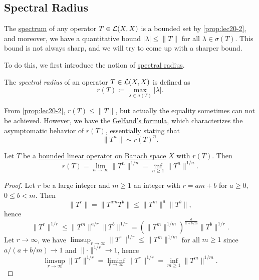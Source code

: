 \subsection{Spectral Radius}
The \hyperref[def:spectrum-point]{spectrum} of any operator \(T\in \mathcal{\MakeUppercase{l}} (X, X)\) is a bounded set by \autoref{prop:lec20-2}, and moreover, we have a quantitative bound \(\vert \lambda  \vert \leq \lVert T \rVert  \) for all \(\lambda \in \sigma (T)\). This bound is not always sharp, and we will try to come up with a sharper bound.

To do this, we first introduce the notion of \hyperref[def:spectral-radius]{spectral radius}.

\begin{definition}\label{def:spectral-radius}
	The \emph{spectral radius} of an operator \(T\in \mathcal{\MakeUppercase{l}} (X, X)\) is defined as
	\[
		r(T) \coloneqq \max _{\lambda\in \sigma (T) }\vert \lambda \vert .
	\]
\end{definition}

From \autoref{prop:lec20-2}, \(r(T) \leq \lVert T \rVert \), but actually the equality sometimes can not be achieved. However, we have the \hyperref[thm:Gelfand-formula]{Gelfand's formula}, which characterizes the asymptomatic behavior of \(r(T)\), essentially stating that
\[
	\lVert T^n \rVert \sim r(T)^n.
\]

\begin{theorem}\label{thm:Gelfand-formula}
	Let \(T\) be a \hyperref[def:bounded-linear-op]{bounded linear operator} on \hyperref[def:Banach-space]{Banach space} \(X\) with \(r(T)\). Then
	\[
		r(T) = \lim_{n \to \infty} \lVert T^n \rVert ^{1 / n} = \inf _{n\geq 1}\lVert T^n \rVert ^{1 / n}.
	\]
\end{theorem}
\begin{proof}\let\qed\relax
	Let \(r\) be a large integer and \(m\geq 1\) an integer with \(r = am+b\) for \(a \geq 0\), \(0 \leq b < m\). Then
	\[
		\lVert T^r \rVert
		= \lVert T^{am} T^b\rVert
		\leq \lVert T^m \rVert ^a \lVert T^b \rVert,
	\]
	hence
	\[
		\lVert T^r \rVert ^{1 / r}
		\leq \lVert T^m \rVert ^{a / r} \lVert T^b \rVert ^{1 / r}
		= \left( \lVert T^m \rVert ^{1 / m} \right) ^{\frac{a}{a+ b / m}} \lVert T^b \rVert ^{1 / r}.
	\]
	Let \(r \to \infty \), we have \(\limsup_{r \to \infty} \lVert T^r \rVert ^{1 / r} \leq \lVert T^m \rVert ^{1 / m}\) for all \(m \geq 1\) since \(a / (a + b / m) \to 1\) and \(\lVert \cdot \rVert ^{1 / r} \to 1\), hence
	\[
		\limsup_{r \to \infty} \lVert T^r \rVert ^{1 / r}
		= \liminf_{r \to \infty} \lVert T^r \rVert ^{1 / r}
		= \inf _{m\geq 1}\lVert T^m \rVert ^{1 / m}.
	\]
\end{proof}